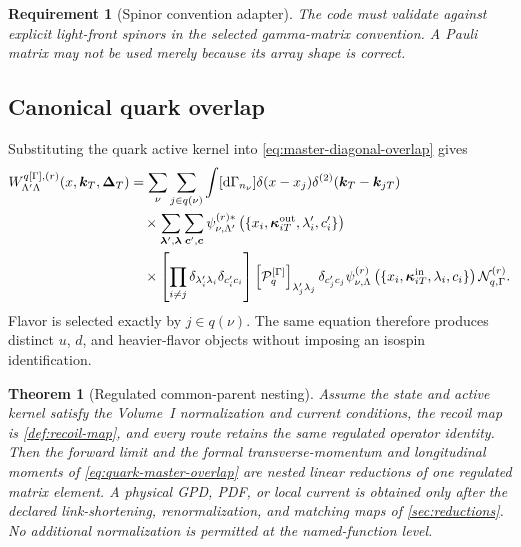 \documentclass[11pt]{article}
\newtheorem{requirement}[definition]{Requirement}
\newtheorem{theorem}[definition]{Theorem}
\newcommand{\kT}{\bm{k}_{T}}
\newcommand{\DT}{\bm{\Delta}_{T}}
\newcommand{\dd}{\mathrm{d}}
\newcommand{\cP}{\mathcal P}
\newcommand{\cN}{\mathcal N}
\begin{document}
\begin{requirement}[Spinor convention adapter]
\label{req:spinor-adapter}
The code must validate 
against explicit light-front spinors in the selected gamma-matrix convention.
A Pauli matrix may not be used merely because its array shape is correct.
\end{requirement}

\subsection{Canonical quark overlap}

Substituting the quark active kernel into
\cref{eq:master-diagonal-overlap} gives
\begin{align}
 W_{\Lambda'\Lambda}^{q[\Gamma],(r)}
 (x,\kT,\DT)
 &=\sum_{\nu}
   \sum_{j\in q(\nu)}
   \int[\dd\Gamma_{n_\nu}]
   \delta(x-x_j)\delta^{(2)}(\kT-\bm{k}_{jT})
\nonumber\\
 &\quad\times
 \sum_{\boldsymbol\lambda',\boldsymbol\lambda}
 \sum_{\boldsymbol c',\boldsymbol c}
 \psi_{\nu,\Lambda'}^{(r)*}
 \left(\{x_i,\bm\kappa_{iT}^{\rm out},
             \lambda_i',c_i'\}\right)
\nonumber\\
 &\quad\times
 \left[\prod_{i\ne j}
 \delta_{\lambda_i'\lambda_i}\delta_{c_i'c_i}\right]
 \left[\cP_q^{[\Gamma]}\right]_{\lambda_j'\lambda_j}
 \delta_{c_j'c_j}
 \psi_{\nu,\Lambda}^{(r)}
 \left(\{x_i,\bm\kappa_{iT}^{\rm in},
             \lambda_i,c_i\}\right)
 \cN_{q,\Gamma}^{(r)}.
\label{eq:quark-master-overlap}
\end{align}
Flavor is selected exactly by \(j\in q(\nu)\).  The same equation therefore
produces distinct \(u\), \(d\), and heavier-flavor objects without imposing
an isospin identification.

\begin{theorem}[Regulated common-parent nesting]
\label{thm:canonical-common-parent}
Assume the state and active kernel satisfy the Volume~I normalization and
current conditions, the recoil map is \cref{def:recoil-map}, and every route
retains the same regulated operator identity.  Then the forward limit and the
formal transverse-momentum and longitudinal moments of
\cref{eq:quark-master-overlap} are nested linear reductions of one regulated
matrix element.  A physical GPD, PDF, or local current is obtained only after
the declared link-shortening, renormalization, and matching maps of
\cref{sec:reductions}.  No additional normalization is permitted at the
named-function level.
\end{theorem}
\end{document}
